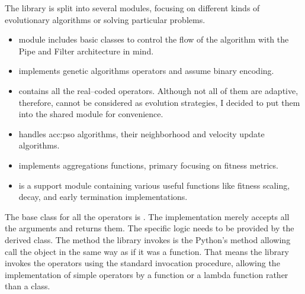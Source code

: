 The library is split into several modules, focusing on different kinds of evolutionary algorithms or solving particular problems.
\begin{itemize}
    \item {} module includes basic classes to control the flow of the algorithm with the Pipe and Filter architecture in mind.
    \item {} implements genetic algorithms operators and assume binary encoding.
    \item {} contains all the real--coded operators. Although not all of them are adaptive, therefore, cannot be considered as evolution strategies, I decided to put them into the shared module for convenience.
    \item {} handles \acrlong{acc:pso} algorithms, their neighborhood and velocity update algorithms.
    \item {} implements aggregations functions, primary focusing on fitness metrics.
    \item {} is a support module containing various useful functions like fitness scaling, decay, and early termination implementations.
\end{itemize}

The base class for all the operators is . The implementation merely accepts all the arguments and returns them. The specific logic needs to be provided by the derived class. The method the library invokes is the Python's  method allowing call the object in the same way as if it was a function. That means the library invokes the operators using the standard invocation procedure, allowing the implementation of simple operators by a function or a lambda function rather than a class.

